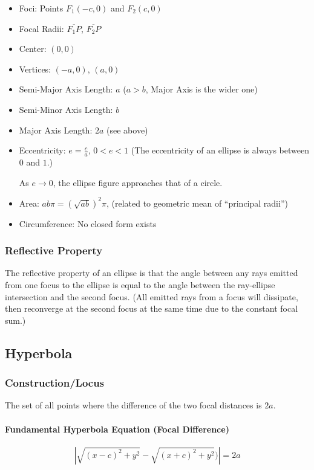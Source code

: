 \documentclass{article}
\begin{document}
\begin{itemize}
    \item Foci: Points $F_1(-c, 0)$ and $F_2(c, 0)$
    \item Focal Radii: $\overline{F_1P}$, $\overline{F_2P}$
    \item Center: $(0, 0)$
    \item Vertices: $(-a, 0)$, $(a, 0)$
    \item Semi-Major Axis Length: $a$ ($a > b$, Major Axis is the wider one)
    \item Semi-Minor Axis Length: $b$
    \item Major Axis Length: $2a$ (see above)
    \item Eccentricity: $e = \frac{c}{a}$, $0 < e < 1$ (The eccentricity of an ellipse is always between $0$ and $1$.)

        As $e \to 0$, the ellipse figure approaches that of a circle.
    \item Area: $ab\pi = (\sqrt{ab})^2\pi$, (related to geometric mean of ``principal radii'')
    \item Circumference: No closed form exists
\end{itemize}

\subsubsection{Reflective Property}
The reflective property of an ellipse is that the angle between any rays emitted from one focus to the ellipse is equal to the angle between the ray-ellipse intersection and the second focus. (All emitted rays from a focus will dissipate, then reconverge at the second focus at the same time due to the constant focal sum.)

\subsection{Hyperbola}
\subsubsection{Construction/Locus}
The set of all points where the difference of the two focal distances is $2a$.

\paragraph{Fundamental Hyperbola Equation (Focal Difference)}
$$|\sqrt{(x-c)^2+y^2}-\sqrt{(x+c)^2+y^2})| = 2a$$
\end{document}
